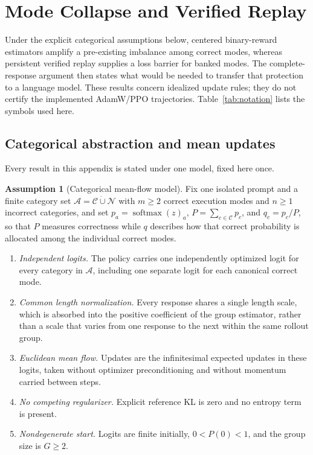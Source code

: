 \documentclass{article}
\newcommand{\1}{\mathbf 1}
\theoremstyle{remark}
\theoremstyle{definition}
\newtheorem{assumption}[lemma]{Assumption}
\theoremstyle{plain}
\begin{document}
\section{Mode Collapse and Verified Replay}
\label{app:theory}

Under the explicit categorical assumptions below, centered binary-reward
estimators amplify a pre-existing imbalance among correct modes,
whereas persistent verified replay supplies a loss barrier for banked modes.
The complete-response argument then states what would be needed to transfer
that protection to a language model. These results concern idealized update
rules; they do not certify the implemented AdamW/PPO trajectories.
Table~\ref{tab:notation} lists the symbols used here.

\subsection{Categorical abstraction and mean updates}
\label{app:theory-grpo-mean}

Every result in this appendix is stated under one model, fixed here once.

\begin{assumption}[Categorical mean-flow model]
\label{ass:categorical-mean-flow}
Fix one isolated prompt and a finite category set
$\mathcal A=\mathcal C\mathbin{\dot\cup}\mathcal N$ with $m\ge2$ correct
execution modes and $n\ge1$ incorrect categories, and set
$p_a=\operatorname{softmax}(z)_a$, $P=\sum_{c\in\mathcal C}p_c$, and
$q_c=p_c/P$, so that $P$ measures correctness while $q$ describes how that
correct probability is allocated among the individual correct modes.
\begin{enumerate}
\item[(A1)] \emph{Independent logits.} The policy carries one independently
  optimized logit for every category in $\mathcal A$, including one separate
  logit for each canonical correct mode.
\item[(A2)] \emph{Common length normalization.} Every response shares a single
  length scale, which is absorbed into the positive coefficient of the group
  estimator, rather than a scale that varies from one response to the next
  within the same rollout group.
\item[(A3)] \emph{Euclidean mean flow.} Updates are the infinitesimal expected
  updates in these logits, taken without optimizer preconditioning and without
  momentum carried between steps.
\item[(A4)] \emph{No competing regularizer.} Explicit reference KL is zero and
  no entropy term is present.
\item[(A5)] \emph{Nondegenerate start.} Logits are finite initially,
  $0<P(0)<1$, and the group size is $G\ge2$.
\end{enumerate}
\end{assumption}
\end{document}
